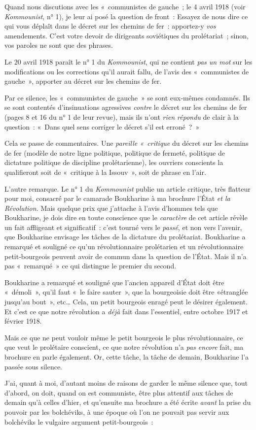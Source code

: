 \documentclass[french,twoside]{book} %
\begin{document}
\noindent Quand nous discutions avec les « communistes de gauche ; le 4 avril 1918 (voir \emph{Kommounist}, n° 1), je leur ai posé la question de front : Essayez de nous dire ce qui vous déplaît dans le décret sur les chemins de fer : apportez-y \emph{vos} amendements. C'est votre devoir de dirigeants soviétiques du prolétariat ; sinon, vos paroles ne sont que des phrases.\par
Le 20 avril 1918 paraît le n° 1 du \emph{Kommounist}, qui ne contient \emph{pas un mot} sur les modifications ou les corrections qu’il aurait fallu, de l’avis des « communistes de gauche », apporter au décret sur les chemins de fer.\par
Par ce silence, les « communistes de gauche » se sont eux‑mêmes condamnés. Ils se sont contentés d’insinuations agressives \emph{contre} le décret sur les chemins de fer (pages 8 et 16 du n° 1 de leur revue), mais ils n’ont \emph{rien répondu} de clair à la question : « Dans quel sens corriger le décret s’il est erroné ? »\par
Cela se passe de commentaires. Une \emph{pareille « critique} du décret sur les chemins de fer (modèle de notre ligne politique, politique de fermeté, politique de dictature politique de discipline prolétarienne), les ouvriers conscients la qualifieront soit de « critique à la Issouv », soit de phrase en l’air.\par
L'autre remarque. Le n° 1 du \emph{Kommounist} publie un article critique, très flatteur pour moi, consacré par le camarade Boukharine à ma brochure l’État\emph{ et la Révolution.} Mais quelque prix que j’attache à l’avis d’hommes tels que Boukharine, je dois dire en toute conscience que le \emph{caractère} de cet article révèle un fait affligeant et significatif : c’est tourné vers le \emph{passé}, et non vers l’avenir, que Boukharine envisage les tâches de la dictature du prolétariat. Boukharine a remarqué et souligné ce qu’un révolutionnaire prolétarien et un révolutionnaire petit‑bourgeois peuvent avoir de commun dans la question de l’État. Mais il n’a pas « remarqué » ce qui distingue le premier du second.\par
Boukharine a remarqué et souligné que l’ancien appareil d’État doit être « démoli », qu’il faut « le faire sauter », que la bourgeoisie doit être «étranglée jusqu’au bout », etc… Cela, un petit bourgeois enragé peut le désirer également. Et c’est ce que notre révolution a \emph{déjà} fait dans l’essentiel, entre octobre 1917 et février 1918.\par
Mais ce que ne peut vouloir même le petit bourgeois le plus révolutionnaire, ce que veut le prolétaire conscient, ce que notre révolution n’a \emph{pas encore} fait, ma brochure en parle également. Or, cette tâche, la tâche de demain, Boukharine l’a passée sous silence.\par
J'ai, quant à moi, d’autant moins de raisons de garder le même silence que, tout d’abord, on doit, quand on est communiste, être plus attentif aux tâches de demain qu’à celles d’hier, et qu’ensuite ma brochure a été écrite \emph{avant} la prise du pouvoir par les bolchéviks, à une époque où l’on ne pouvait pas servir aux bolchéviks le vulgaire argument petit‑bourgeois : \par
\end{document}
